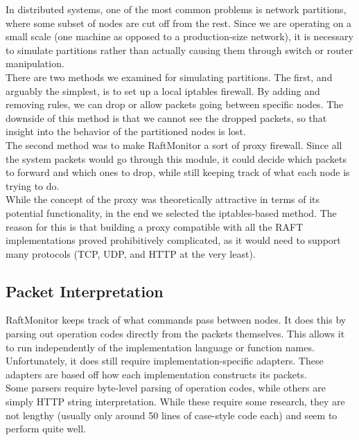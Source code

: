 \documentclass[UTF8]{article}
\begin{document}
In distributed systems, one of the most common problems is network partitions, where some subset of nodes are cut off from the rest. Since we are operating on a small scale (one machine as opposed to a production-size network), it is necessary to simulate partitions rather than actually causing them through switch or router manipulation.
\\ \indent There are two methods we examined for simulating partitions. The first, and arguably the simplest, is to set up a local iptables firewall. By adding and removing rules, we can drop or allow packets going between specific nodes. The downside of this method is that we cannot see the dropped packets, so that insight into the behavior of the partitioned nodes is lost.
\\ \indent The second method was to make RaftMonitor a sort of proxy firewall. Since all the system packets would go through this module, it could decide which packets to forward and which ones to drop, while still keeping track of what each node is trying to do.
\\ \indent While the concept of the proxy was theoretically attractive in terms of its potential functionality, in the end we selected the iptables-based method. The reason for this is that building a proxy compatible with all the RAFT implementations proved prohibitively complicated, as it would need to support many protocols (TCP, UDP, and HTTP at the very least). 

\subsection{Packet Interpretation}
RaftMonitor keeps track of what commands pass between nodes. It does this by parsing out operation codes directly from the packets themselves. This allows it to run independently of the implementation language or function names. Unfortunately, it does still require implementation-specific adapters. These adapters are based off how each implementation constructs its packets.
\\ \indent Some parsers require byte-level parsing of operation codes, while others are  simply HTTP string interpretation. While these require some research, they are not lengthy (usually only around 50 lines of case-style code each) and seem to perform quite well.
\end{document}

